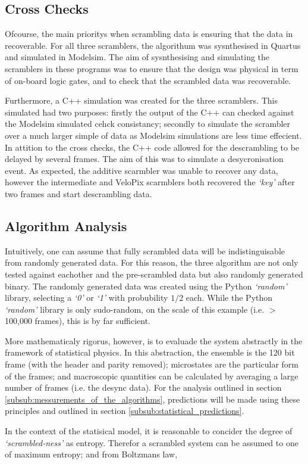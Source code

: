 	\subsection{Cross Checks} %
	\label{sub:cross_checks}
	
		Ofcourse, the main prioritys when scrambling data is ensuring that the data in recoverable.
		For all three scramblers, the algorithum was sysnthesised in Quartus\supercite{ref:quartus} and simulated in Modelsim\supercite{ref:modelsim}.
		The aim of sysnthesising and simulating the scramblers in these programs was to ensure that the design was physical in term of on-board logic gates, and to check that the scrambled  data was recoverable.

		Furthermore, a C++ simulation was created for the three scramblers.
		This simulated had two purposes:
		firstly the output of the C++ can checked against the Modelsim simulated cehck consistancy;
		secondly to simulate the scrambler over a much larger simple of data as Modelsim simulations are less time effecient.
		In attition to the cross checks, the C++ code allowed for the descrambling to be delayed by several frames. The aim of this was to simulate a desycronisation event.
		As expected, the additive scarmbler was unable to recover any data, however the intermediate and VeloPix scarmblers both recovered the \textit{`key'} after two frames and start descrambling data.


	\subsection{Algorithm Analysis}
	\label{sub:algorithm_analysis}

		Intuitively, one can assume that fully scrambled data will be indistinguisable from randomly generated data. 
		For this reason, the three algorithm are not only tested against eachother and the pre-scrambled data but also randomly generated binary.
		The randomly generated data was created using the Python \textit{`random'} library, selecting a \textit{`0'} or \textit{`1'} with probubility $1/2$ each.
		While the Python \textit{`random'} library is only sudo-random, on the scale of this example (i.e. $>$ 100,000 frames), this is by far sufficient.
		\par
		More mathematicaly rigorus, however, is to evaluade the system abstractly in the framework of statistical physics.
		In this abstraction, the ensemble is the 120 bit frame (with the header and parity removed); 
		microstates are the particular form of the frames;
		and macroscopic quantities can be calculated by averaging a large number of frames (i.e. the desync data).
		For the analysis outlined in section \ref{subsub:messurements_of_the_algorithms}, predictions will be made using these principles and outlined in section \ref{subsub:statistical_predictions}.
		\par
		In the context of the statisical model, it is reasonable to concider the degree of \textit{`scrambled-ness'} as entropy.
		Therefor a scrambled system can be assumed to one of maximum entropy; and from Boltzmans law,

